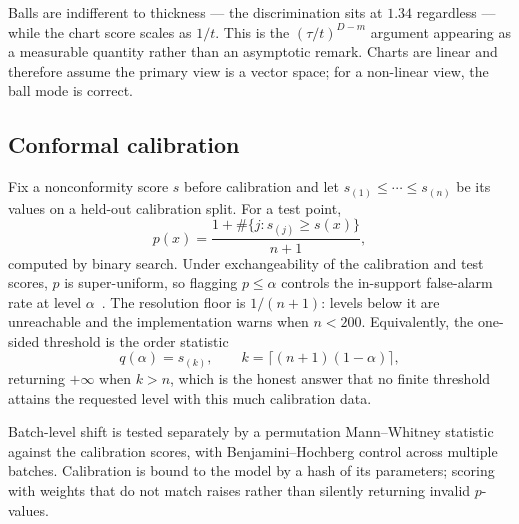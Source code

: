 \documentclass[12pt]{iopart}
\theoremstyle{definition}
\theoremstyle{plain}
\theoremstyle{remark}
\begin{document}
Balls are indifferent to thickness --- the discrimination sits at $1.34$
regardless --- while the chart score scales as $1/t$. This is the
$(\tau/t)^{D-m}$ argument appearing as a measurable quantity rather than an
asymptotic remark. Charts are linear and therefore assume the primary view is a
vector space; for a non-linear view, the ball mode is correct.

\subsection{Conformal calibration}
\label{sec:pvalue}

Fix a nonconformity score $s$ before calibration and let
$s_{(1)}\le\cdots\le s_{(n)}$ be its values on a held-out calibration split.
For a test point,
\begin{equation}
\label{eq:pvalue}
p(x) = \frac{1+\#\{j: s_{(j)}\ge s(x)\}}{n+1},
\end{equation}
computed by binary search. Under exchangeability of the calibration and test
scores, $p$ is super-uniform, so flagging $p\le\alpha$ controls the in-support
false-alarm rate at level $\alpha$~\cite{vovk2005}. The resolution floor is
$1/(n+1)$: levels below it are unreachable and the implementation warns when
$n<200$. Equivalently, the one-sided threshold is the order statistic
\begin{equation}
\label{eq:thresh}
q(\alpha)=s_{(k)},
\qquad
k=\lceil (n+1)(1-\alpha)\rceil,
\end{equation}
returning $+\infty$ when $k>n$, which is the honest answer that no finite
threshold attains the requested level with this much calibration data.

Batch-level shift is tested separately by a permutation Mann--Whitney statistic
against the calibration scores, with Benjamini--Hochberg control across
multiple batches. Calibration is bound to the model by a hash of its parameters;
scoring with weights that do not match raises rather than silently returning
invalid $p$-values.
\end{document}
